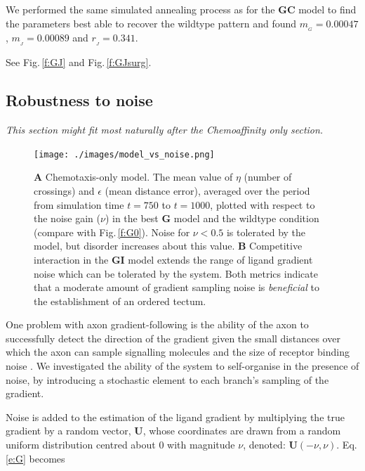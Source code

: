 \documentclass[11pt, a4paper]{article}
\begin{document}
We performed the same simulated annealing process as for the
$\mathbf{GC}$ model to find the parameters best able to recover the wildtype
pattern and found $m_{\!_G} = 0.00047$, $m_{\!_J} = 0.00089$ and $r_{\!_J} =
0.341$.

See Fig.\,\ref{f:GJ} and Fig.\,\ref{f:GJsurg}.


\subsection*{Robustness to noise}

\emph{This section might fit most naturally after the Chemoaffinity only section.}

\begin{figure}
\centering
\texttt{[image: ./images/model\_vs\_noise.png]}
\caption{ \textbf{A} Chemotaxis-only model. The mean value of $\eta$ (number of crossings) and $\epsilon$
(mean distance error), averaged over the period from simulation time $t=750$ to $t=1000$, plotted with respect to the
noise gain ($\nu$) in the best $\mathbf{G}$ model and the wildtype condition (compare with
Fig.\,\ref{f:G0}). Noise for $\nu < 0.5$ is tolerated by the model, but
disorder increases about this value.
\textbf{B} Competitive interaction in the $\mathbf{GI}$ model extends the
range of ligand gradient noise which can be tolerated by the system.
Both metrics indicate that a moderate
amount of gradient sampling noise is \emph{beneficial} to the establishment of
an ordered tectum.}
\label{f:noise}
\end{figure}

One problem with axon gradient-following is the ability of the axon to
successfully detect the direction of the gradient given the small distances
over which the axon can sample signalling molecules and the size of receptor
binding noise \citep{goodhill_noise_2014}.  We investigated the ability of the
system to self-organise in the presence of noise, by introducing a stochastic
element to each branch's sampling of the gradient.

Noise is added to the estimation of the ligand gradient by multiplying the
true gradient by a random vector, $\mathbf{U}$, whose coordinates are drawn
from a random uniform distribution centred about 0 with magnitude $\nu$, denoted:
$\mathbf{U}(-\nu, \nu)$. Eq.\,\ref{e:G} becomes
\end{document}
